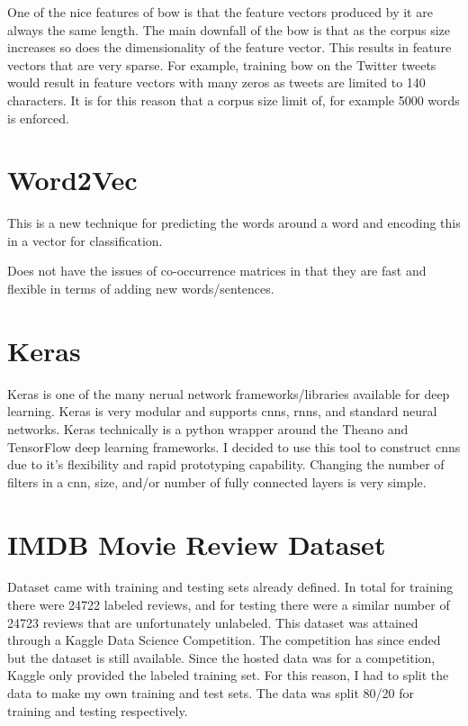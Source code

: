 \documentclass[12pt]{article}
\begin{document}
One of the nice features of \ac{bow} is that the feature vectors produced by it are always the same length. The main downfall of the \ac{bow} is that as the corpus size increases so does the dimensionality of the feature vector. This results in feature vectors that are very sparse. For example, training \ac{bow} on the Twitter tweets would result in feature vectors with many zeros as tweets are limited to 140 characters. It is for this reason that a corpus size limit of, for example 5000 words is enforced. 

\section{Word2Vec} \label{word2vec}

This is a new technique \cite{word2vec} for predicting the words around a word and encoding this in a vector for classification.

Does not have the issues of co-occurrence matrices in that they are fast and flexible in terms of adding new words/sentences.

\section {Keras}
Keras \cite{chollet2015keras} is one of the many nerual network frameworks/libraries available for deep learning. Keras is very modular and supports \ac{cnn}s, \ac{rnn}s, and standard neural networks. Keras technically is a python wrapper around the Theano and TensorFlow deep learning frameworks. I decided to use this tool to construct \ac{cnn}s due to it's flexibility and rapid prototyping capability. Changing the number of filters in a \ac{cnn}, size, and\slash or number of fully connected layers is very simple. 



\section{IMDB Movie Review Dataset}
Dataset came with training and testing sets already defined. In total for training there were 24722 labeled reviews, and for testing there were a similar number of 24723 reviews that are unfortunately unlabeled. This dataset was attained through a Kaggle Data Science Competition. The competition has since ended but the dataset is still available. Since the hosted data was for a competition, Kaggle only provided the labeled training set. For this reason, I had to split the data to make my own training and test sets. The data was split 80\slash20 for training and testing respectively.
\end{document}
